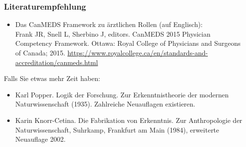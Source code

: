 \documentclass{beamer}
\begin{document}


\begin{frame}

\frametitle{Literaturempfehlung}

\begin{itemize}
    \item 
    Das CanMEDS Framework zu ärztlichen Rollen (auf Englisch):  \\
    Frank JR, Snell L, Sherbino J, editors. CanMEDS 2015 Physician
Competency Framework. Ottawa: Royal College of Physicians
and Surgeons of Canada; 2015.  \url{https://www.royalcollege.ca/en/standards-and-accreditation/canmeds.html}

\end{itemize}

Falls Sie etwas mehr Zeit haben:

\begin{itemize}

\item 
Karl Popper. Logik der Forschung. Zur Erkenntnistheorie der modernen Naturwissenschaft (1935). Zahlreiche Neuauflagen existieren.

\item 
Karin Knorr-Cetina. Die Fabrikation von Erkenntnis. Zur Anthropologie der Naturwissenschaft, Suhrkamp, Frankfurt am Main (1984), erweiterte Neuauflage 2002.

\end{itemize}


\end{frame}



\end{document}
